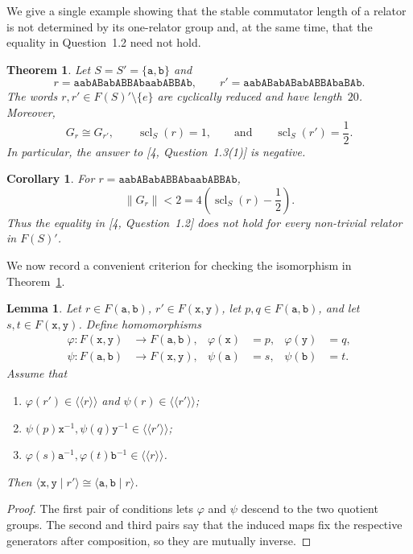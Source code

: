 \documentclass[12pt,a4paper,oneside]{amsart}
\DeclareMathOperator{\scl}{scl}
\newcommand{\nc}[1]{\langle\!\langle #1 \rangle\!\rangle}
\newcommand{\genrel}[2]{\langle #1 \mid #2 \rangle}
\theoremstyle{plain}
\newtheorem{theoremA}{Theorem}
\newtheorem{lemma}[theorem]{Lemma}
\newtheorem{corollary}[theorem]{Corollary}
\theoremstyle{definition}
\begin{document}
We give a single example showing that the stable commutator length of a relator is not determined by its one-relator group and, at the same time, that the equality in Question~1.2 need not hold.

\begin{theoremA}\label{thm:main}
Let \(S=S'=\{\mathtt a,\mathtt b\}\) and
\[
  r=\mathtt{aabABabABBAbaabABBAb},\qquad
  r'=\mathtt{aabABabABabABBAbaBAb}.
\]
The words \(r,r'\in F(S)'\setminus\{e\}\) are cyclically reduced and have length~\(20\). Moreover,
\[
  G_r\cong G_{r'},\qquad \scl_S(r)=1,
  \qquad\text{and}\qquad \scl_S(r')=\frac12.
\]
In particular, the answer to [4, Question~1.3(1)] is negative.
\end{theoremA}

\begin{corollary}\label{cor:simvol}
For \(r=\mathtt{aabABabABBAbaabABBAb}\),
\[
  \lVert G_r\rVert<2
  =4\left(\scl_S(r)-\frac12\right).
\]
Thus the equality in [4, Question~1.2] does not hold for every non-trivial relator in \(F(S)'\).
\end{corollary}

We now record a convenient criterion for checking the isomorphism in Theorem~\ref{thm:main}.

\begin{lemma}\label{lem:cert}
Let \(r\in F(\mathtt a,\mathtt b)\), \(r'\in F(\mathtt x,\mathtt y)\), let \(p,q\in F(\mathtt a,\mathtt b)\), and let \(s,t\in F(\mathtt x,\mathtt y)\). Define homomorphisms
\[
\begin{aligned}
  \varphi\colon F(\mathtt x,\mathtt y)&\longrightarrow F(\mathtt a,\mathtt b),
  &\varphi(\mathtt x)&=p,&\varphi(\mathtt y)&=q,\\
  \psi\colon F(\mathtt a,\mathtt b)&\longrightarrow F(\mathtt x,\mathtt y),
  &\psi(\mathtt a)&=s,&\psi(\mathtt b)&=t.
\end{aligned}
\]
Assume that
\begin{enumerate}
  \item \(\varphi(r')\in\nc r\) and \(\psi(r)\in\nc{r'}\);
  \item \(\psi(p)\mathtt x^{-1},\psi(q)\mathtt y^{-1}\in\nc{r'}\);
  \item \(\varphi(s)\mathtt a^{-1},\varphi(t)\mathtt b^{-1}\in\nc r\).
\end{enumerate}
Then \(\genrel{\mathtt{x,y}}{r'}\cong\genrel{\mathtt{a,b}}r\).
\end{lemma}

\begin{proof}
The first pair of conditions lets \(\varphi\) and \(\psi\) descend to the two quotient groups. The second and third pairs say that the induced maps fix the respective generators after composition, so they are mutually inverse.
\end{proof}
\end{document}
